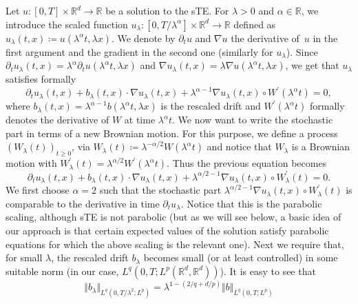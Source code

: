 \documentclass[a4paper,10pt]{article}
\newcommand\1{\mathbbm{1}}
\numberwithin{equation}{section}
\begin{document}
Let $u \colon[ 0,T] \times\mathbb{R}^{d}\rightarrow\mathbb{R}$ be a solution to the sTE. For $\lambda>0$  and $\alpha \in \mathbb{R}$, we introduce the scaled function $u_{\lambda} \colon [ 0,T/\lambda^{\alpha}] \times\mathbb{R}^{d}\rightarrow\mathbb{R}$ defined as $u_{\lambda}(t,x) \coloneqq u(\lambda^{\alpha }t,\lambda x)$. We denote by $\partial_t u$ and $\nabla u$ the derivative of~$u$ in the first argument and the gradient in the second one (similarly for $u_{\lambda}$). Since $\partial_t u_{\lambda}(t,x) =\lambda^{\alpha} \partial_t u(\lambda^{\alpha }t,\lambda x)$ and $\nabla u_{\lambda}(t,x)=\lambda\nabla u(\lambda^{\alpha}t,\lambda x)$, we get that $u_{\lambda}$ satisfies formally 
\begin{equation*}
\partial_t u_{\lambda}(t,x)+b_{\lambda}(t,x)\cdot\nabla
u_{\lambda}(t,x)+\lambda^{\alpha-1}\nabla u_{\lambda}(t,x)\circ W^{\prime}(\lambda^{\alpha}t)=0 ,
\end{equation*}
where $b_{\lambda}(t,x)=\lambda^{\alpha-1}b(\lambda^{\alpha}t,\lambda x)$ is the rescaled drift and $W^{\prime}(\lambda^{\alpha}t)$ formally denotes the derivative of $W$ at time $\lambda^{\alpha}t$. We now want to write the stochastic part in terms of a new Brownian motion. For this purpose, we define a process $(W_{\lambda
}(t))_{t\geq0}$, via $W_{\lambda}(t)\coloneqq \lambda^{-\alpha /2}W(\lambda^{\alpha}t)$ and notice that $W_{\lambda}$ is a Brownian motion with $W_{\lambda}^{\prime}(t)=\lambda^{\alpha/2}W^{\prime}(\lambda^{\alpha}t)$. Thus the previous equation becomes
\begin{equation*}
\partial_t u_{\lambda}(t,x)+b_{\lambda}(t,x)\cdot\nabla
u_{\lambda}(t,x)+\lambda^{\alpha/2-1}\nabla u_{\lambda}(t,x)\circ W_{\lambda
}^{\prime}(t)=0 .
\end{equation*}
We first choose $\alpha=2$ such that the stochastic part $\lambda^{\alpha /2-1}\nabla u_{\lambda}(t,x)\circ W_{\lambda}^{\prime}(t)$ is comparable to the derivative in time $\partial_t u_{\lambda}$. Notice that this is the parabolic scaling, although sTE is not parabolic (but as we will see below, a basic idea of our approach is that certain expected values of the solution satisfy parabolic equations for which the above scaling is the relevant one). Next we require that, for small $\lambda$, the rescaled drift $b_{\lambda}$ becomes small (or at least controlled) in some suitable norm (in our case, $L^{q}( 0,T;L^{p}(\mathbb{R}^{d},\mathbb{R}^{d}) )$). It is easy to see that 
\begin{equation*}
\Vert b_{\lambda}\Vert_{L^{q}(0,T/\lambda^{2};L^{p})
}=\lambda^{1-(2/q+d/p)}\Vert b\Vert_{L^{q}(0,T;L^{p}) }
\end{equation*}
\end{document}
